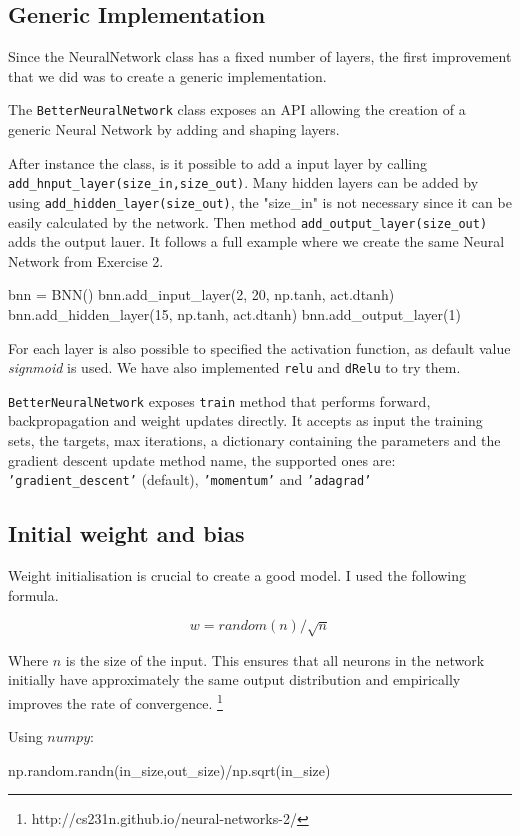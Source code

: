 \documentclass[11pt]{article}
\begin{document}
\subsection{Generic Implementation}
Since the NeuralNetwork class has a fixed number of layers, the first improvement that we did was to create a generic implementation.

The \texttt{BetterNeuralNetwork} class exposes an API allowing the creation of a generic Neural Network by adding and shaping layers.

After instance the class, is it possible to add a input layer by calling \texttt{add\_hnput\_layer(size\_in,size\_out)}. Many hidden layers can be added by using \texttt{add\_hidden\_layer(size\_out)}, the "size\_in" is not necessary since it can be easily calculated by the network. Then method \texttt{add\_output\_layer(size\_out)} adds the output lauer. It follows a full example where we create the same Neural Network from Exercise 2.
\begin{python}
   bnn = BNN()
   bnn.add_input_layer(2, 20, np.tanh, act.dtanh)
   bnn.add_hidden_layer(15, np.tanh, act.dtanh)
   bnn.add_output_layer(1)
\end{python}

For each layer is also possible to specified the activation function, as default value \emph{signmoid} is used. We have also implemented \texttt{relu} and \texttt{dRelu} to try them.

\texttt{BetterNeuralNetwork} exposes \texttt{train} method that performs forward, backpropagation and weight updates directly. It accepts as input the training sets, the targets, max iterations, a dictionary containing the parameters and the gradient descent update method name, the supported ones are: \texttt{'gradient\_descent'} (default), \texttt{'momentum'} and \texttt{'adagrad'}\subsection{Initial weight and bias}
Weight initialisation is crucial to create a good model. I used the following formula.

$$w = random(n)/\sqrt{n}$$

Where $n$ is the size of the input. This ensures that all neurons in the network initially have approximately the same output distribution and empirically improves the rate of convergence. \footnote{http://cs231n.github.io/neural-networks-2/}

Using $numpy$:
\begin{python}
np.random.randn(in_size,out_size)/np.sqrt(in_size)
\end{python}
\end{document}
